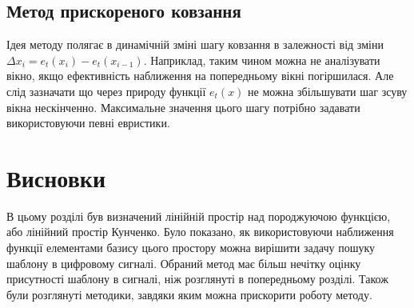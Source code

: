    \subsection{Метод прискореного ковзання}
        Ідея методу полягає в динамічній зміні шагу ковзання в залежності від зміни $\Delta x_i = e_t(x_i) -
        e_t(x_{i-1})$.
        Наприклад, таким чином можна не аналізувати вікно, якщо ефективність наближення на попередньому вікні
        погіршилася.
        Але слід зазначати що через природу функції $e_t(x)$ не можна збільшувати шаг зсуву вікна нескінченно.
        Максимальне значення цього шагу потрібно задавати використовуючи певні евристики.

\section{Висновки}
В цьому розділі був визначений лінійній простір над породжуючою функцією, або лінійний простір Кунченко.
Було показано, як використовуючи наближення функції елементами базису цього простору можна вирішити задачу пошуку
шаблону в цифровому сигналі.
Обраний метод має більш нечітку оцінку присутності шаблону в сигналі, ніж розглянуті в попередньому розділі.
Також були розглянуті методики, завдяки яким можна прискорити роботу методу.

